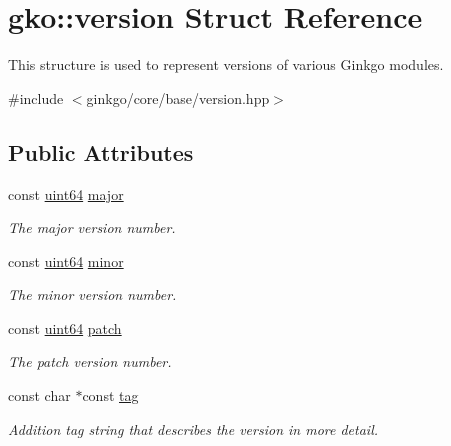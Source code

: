 \hypertarget{structgko_1_1version}{}\section{gko\+:\+:version Struct Reference}
\label{structgko_1_1version}


This structure is used to represent versions of various Ginkgo modules.  




{\ttfamily \#include $<$ginkgo/core/base/version.\+hpp$>$}

\subsection*{Public Attributes}
\begin{DoxyCompactItemize}
\item 
\mbox{\label{structgko_1_1version_a019ce1d31714612e0c77c8ef5eb4cfde}} 
const \hyperlink{namespacegko_ad54a79afecd57aabbb04b1dc611ae55e}{uint64} \hyperlink{structgko_1_1version_a019ce1d31714612e0c77c8ef5eb4cfde}{major}
\begin{DoxyCompactList}\small\item\em The major version number. \end{DoxyCompactList}\item 
\mbox{\label{structgko_1_1version_abb548e6dca39e0a3718ecf13cafbba36}} 
const \hyperlink{namespacegko_ad54a79afecd57aabbb04b1dc611ae55e}{uint64} \hyperlink{structgko_1_1version_abb548e6dca39e0a3718ecf13cafbba36}{minor}
\begin{DoxyCompactList}\small\item\em The minor version number. \end{DoxyCompactList}\item 
\mbox{\label{structgko_1_1version_a7580f68f7cf0600bc620c47ed6330c95}} 
const \hyperlink{namespacegko_ad54a79afecd57aabbb04b1dc611ae55e}{uint64} \hyperlink{structgko_1_1version_a7580f68f7cf0600bc620c47ed6330c95}{patch}
\begin{DoxyCompactList}\small\item\em The patch version number. \end{DoxyCompactList}\item 
const char $\ast$const \hyperlink{structgko_1_1version_a1bd0eaa4d551c145ff9cd0c10e555ac3}{tag}
\begin{DoxyCompactList}\small\item\em Addition tag string that describes the version in more detail. \end{DoxyCompactList}\end{DoxyCompactItemize}


